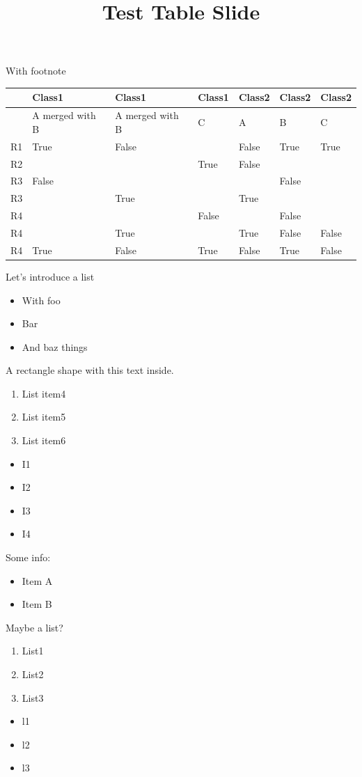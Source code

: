 \documentclass[11pt,a4paper]{article}
\title{Test Table Slide}
\begin{document}
\maketitle

With footnote

\begin{table}[h]
\begin{tabular}{|l|l|l|l|l|l|l|}
\hline
 & Class1 & Class1 & Class1 & Class2 & Class2 & Class2 \\ \hline
 & A merged with B & A merged with B & C & A & B & C \\ \hline
R1 & True & False &  & False & True & True \\ \hline
R2 &  &  & True & False &  &  \\ \hline
R3 & False &  &  &  & False &  \\ \hline
R3 &  & True &  & True &  &  \\ \hline
R4 &  &  & False &  & False &  \\ \hline
R4 &  & True &  & True & False & False \\ \hline
R4 & True & False & True & False & True & False \\ \hline
\end{tabular}
\end{table}

Let’s introduce a list

\begin{itemize}
\item With foo
\item Bar
\item And baz things
\end{itemize}

A rectangle shape with this text inside.

\begin{enumerate}
\item List item4
\item List item5
\item List item6
\end{enumerate}

\begin{itemize}
\item I1
\item I2
\item I3
\item I4
\end{itemize}

Some info:

\begin{itemize}
\item Item A
\item Item B
\end{itemize}

Maybe a list?

\begin{enumerate}
\item List1
\item List2
\item List3
\end{enumerate}

\begin{itemize}
\item l1 
\item l2
\item l3
\end{itemize}
\end{document}
